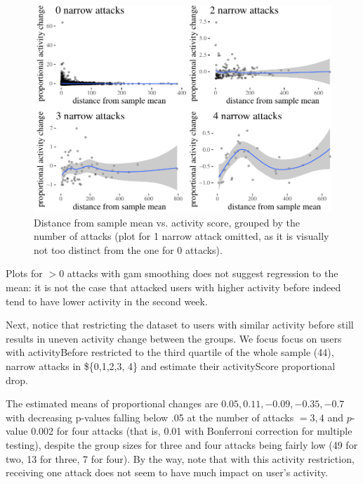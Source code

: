 \documentclass[10pt,dvipsnames]{scrartcl}
\begin{document}
\begin{figure}[H]

\begin{center}\includegraphics[width=1\linewidth]{quittingShortAbridgedRevisions3_files/figure-latex/unnamed-chunk-61-1} \end{center}
\caption{Distance from sample mean vs. activity score, grouped by the number of attacks (plot for 1 narrow attack omitted, as it is visually not too distinct from the one for 0 attacks).}
\label{fig:regression2}
\end{figure}

Plots for \(>0\) attacks with gam smoothing does not suggest regression
to the mean: it is not the case that attacked users with higher activity
before indeed tend to have lower activity in the second week.

Next, notice that restricting the dataset to users with similar activity
before still results in uneven activity change between the groups. We
focus focus on users with \textsf{activityBefore} restricted to the
third quartile of the whole sample (44), narrow attacks in \$\{0,1,2,3,
4\} and estimate their \textsf{activityScore} proportional drop.

\normalsize  The estimated means of proportional changes are
\(0.05, 0.11, -0.09,-0.35, -0.7\) with decreasing p-values falling below
.05 at the number of attacks \(=3, 4\) and \(p\)-value 0.002 for four
attacks (that is, 0.01 with Bonferroni correction for multiple testing),
despite the group sizes for three and four attacks being fairly low (49
for two, 13 for three, 7 for four). By the way, note that with this
activity restriction, receiving one attack does not seem to have much
impact on user's activity.
\end{document}
